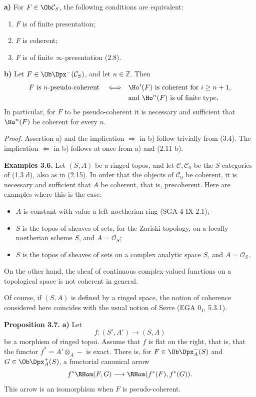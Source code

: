 \documentclass[11pt]{article}
\begin{document}
\textbf{a)} For \(F\in\Ob\mathcal C_S\), the following conditions are equivalent:
\begin{enumerate}[label=(\roman*)]
\item \(F\) is of finite presentation;
\item \(F\) is coherent;
\item \(F\) is of finite \(\infty\)-presentation (2.8).
\end{enumerate}

\textbf{b)} Let \(F\in\Ob\Dpx^-(\mathcal C_S)\), and let \(n\in\mathbb Z\). Then
\[
\begin{split}
F\text{ is }n\text{-pseudo-coherent}
\quad\Longleftrightarrow\quad&
\Ho^i(F)\text{ is coherent for }i\geq n+1,\\
&\text{and }\Ho^n(F)\text{ is of finite type.}
\end{split}
\]
In particular, for \(F\) to be pseudo-coherent it is necessary and sufficient that \(\Ho^n(F)\) be coherent for every \(n\).

\emph{Proof.} Assertion a) and the implication \(\Rightarrow\) in b) follow trivially from (3.4). The implication \(\Leftarrow\) in b) follows at once from a) and (2.11 b).

\textbf{Examples 3.6.} Let \((S,A)\) be a ringed topos, and let \(\mathcal C,\mathcal C_0\) be the \(S\)-categories of (1.3 d), also as in (2.15). In order that the objects of \(\mathcal C_0\) be coherent, it is necessary and sufficient that \(A\) be coherent, that is, precoherent. Here are examples where this is the case:
\begin{itemize}
\item \(A\) is constant with value a left noetherian ring (SGA 4 IX 2.1);
\item \(S\) is the topos of sheaves of sets, for the Zariski topology, on a locally noetherian scheme \(S\), and \(A=\mathcal O_S\);
\item \(S\) is the topos of sheaves of sets on a complex analytic space \(S\), and \(A=\mathcal O_S\).
\end{itemize}
On the other hand, the sheaf of continuous complex-valued functions on a topological space is not coherent in general.

Of course, if \((S,A)\) is defined by a ringed space, the notion of coherence considered here coincides with the usual notion of Serre (EGA \(0_I\), 5.3.1).

\textbf{Proposition 3.7.} \textbf{a)} Let
\[
  f:(S',A')\longrightarrow(S,A)
\]
be a morphism of ringed topoi. Assume that \(f\) is flat on the right, that is, that the functor \(f^*=A'\otimes_A-\) is exact. There is, for \(F\in\Ob\Dpx_A^-(S)\) and \(G\in\Ob\Dpx_A^+(S)\), a functorial canonical arrow
\[
  f^*\RHom(F,G)\longrightarrow \RHom(f^*(F),f^*(G)).
\]
This arrow is an isomorphism when \(F\) is pseudo-coherent.
\end{document}
